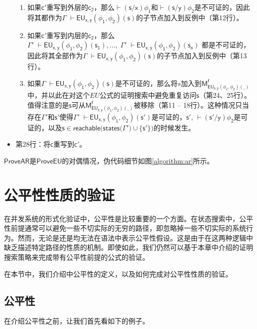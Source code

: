 \begin{itemize}
\begin{enumerate}
		\item 如果$\mathsf{c'}$重写到外层的$\mathsf{c_2}$，那么$\mathsf{\vdash (s/x)\phi_1}$和$\mathsf{\vdash (s/y)\phi_2}$是不可证的，因此将其都作为$\Gamma\;\mathsf{\vdash EU_{x,y}(\phi_1,\phi_2)(s)}$的子节点加入到反例中（第12行）。
		\item 如果$\mathsf{c'}$重写到内层的$\mathsf{c_2}$，那么$\Gamma'\;\mathsf{\vdash EU_{x,y}(\phi_1,\phi_2)(s_1)},...,\;\Gamma'\;\mathsf{\vdash EU_{x,y}(\phi_1,\phi_2)(s_n)}$ 都是不可证的，因此将其全部作为$\Gamma\;\mathsf{\vdash EU_{x,y}(\phi_1,\phi_2)(s)}$的子节点加入到反例中（第13行）。
		\item 如果$\Gamma\;\mathsf{\vdash EU_{x,y}(\phi_1,\phi_2)(s)}$是不可证的，那么将$s$加入到$\mathsf{M_{EU_{x,y}(\phi_1,\phi_2)(\_)}^f}$中，并以此在对这个$EU$公式的证明搜索中避免重复访问$\mathsf{s}$（第24、25行）。值得注意的是$\mathsf{s}$可从$\mathsf{M_{EU_{x,y}(\phi_1,\phi_2)(\_)}^f}$被移除（第11 -- 18行）。这种情况只当存在${\Gamma'}$和$\mathsf{s'}$使得$\Gamma'\;\mathsf{\vdash EU_{x,y}(\phi_1,\phi_2)(s')}$是可证的，$\mathsf{s'}$, $\mathsf{\vdash (s'/y)\phi_2}$是可证的，以及$\mathsf{s\in reachable(states(}\Gamma'\mathsf{)\cup \{s'\})}$的时候发生。
	\end{enumerate}
	\item 第28行：将$\mathsf{c}$重写到$\mathsf{c'}$。
\end{itemize}

$\mathsf{ProveAR}$是$\mathsf{ProveEU}$的对偶情况，伪代码细节如图\ref{algorithm:ar}所示。
\section{公平性性质的验证}

在并发系统的形式化验证中，公平性是比较重要的一个方面。在状态搜索中，公平性前提通常可以避免一些不切实际的无穷的路径，即忽略掉一些不切实际的系统行为\cite{BaierKatoen08}。然而，无论是\CTL{}还是\CTLP{}均无法在语法中表示公平性假设。这是由于在这两种逻辑中缺乏描述特定路径的性质的机制。即使如此，我们仍然可以基于本章中介绍的证明搜索策略来完成带有公平性前提的\CTLP{}公式的验证。



在本节中，我们介绍\CTLP{}中公平性的定义，以及如何完成对公平性性质的验证。

\subsection{公平性}
在介绍公平性之前，让我们首先看如下的例子。

